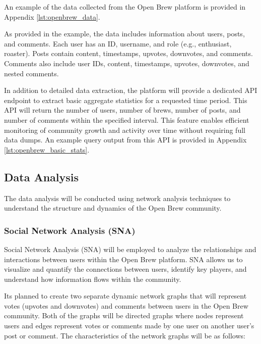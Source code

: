 \documentclass[12pt]{article}
\begin{document}
An example of the data collected from the Open Brew platform is provided in Appendix \ref{lst:openbrew_data}.

As provided in the example, the data includes information about users, posts, and comments. Each user has an ID, username, and role (e.g., enthusiast, roaster). Posts contain content, timestamps, upvotes, downvotes, and comments. Comments also include user IDs, content, timestamps, upvotes, downvotes, and nested comments.

In addition to detailed data extraction, the platform will provide a dedicated API endpoint to extract basic aggregate statistics for a requested time period. This API will return the number of users, number of brews, number of posts, and number of comments within the specified interval. This feature enables efficient monitoring of community growth and activity over time without requiring full data dumps. An example query output from this API is provided in Appendix \ref{lst:openbrew_basic_stats}.

\subsection{Data Analysis}
\label{subsection:data_analysis}
The data analysis will be conducted using network analysis techniques to understand the structure and dynamics of the Open Brew community.

\subsubsection{Social Network Analysis (SNA)}
\label{subsubsection:social_network_analysis}
Social Network Analysis (SNA) will be employed to analyze the relationships and interactions between users within the Open Brew platform. SNA allows us to visualize and quantify the connections between users, identify key players, and understand how information flows within the community.

Its planned to create two separate dynamic network graphs that will represent votes (upvotes and downvotes) and comments between users in the Open Brew community. Both of the graphs will be directed graphs where nodes represent users and edges represent votes or comments made by one user on another user's post or comment. The characteristics of the network graphs will be as follows:
\end{document}
